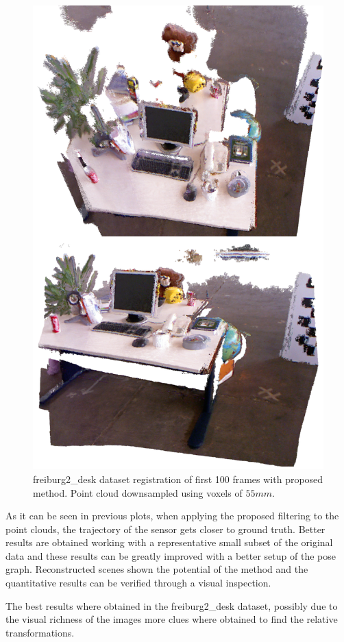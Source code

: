\begin{figure}[H]
\begin{center}
\includegraphics[scale=0.27]{images/freiburg2_desk.png}
\caption{freiburg2\_desk dataset registration of first 100 frames with proposed method. Point cloud downsampled using voxels of $55mm$.}
\label{fig:jan}
\end{center}
\end{figure}


As it can be seen in previous plots, when applying the proposed filtering to the point clouds, the trajectory of the sensor gets 
closer to ground truth. Better results are obtained working with a representative small subset of the original data and these results 
can be greatly improved with a better setup of the pose graph. Reconstructed scenes shown the potential of the method and the quantitative 
results can be verified through a visual inspection. 

The best results where obtained in the freiburg2\_desk dataset, possibly due to the visual richness of the images more clues where obtained 
to find the relative transformations.
